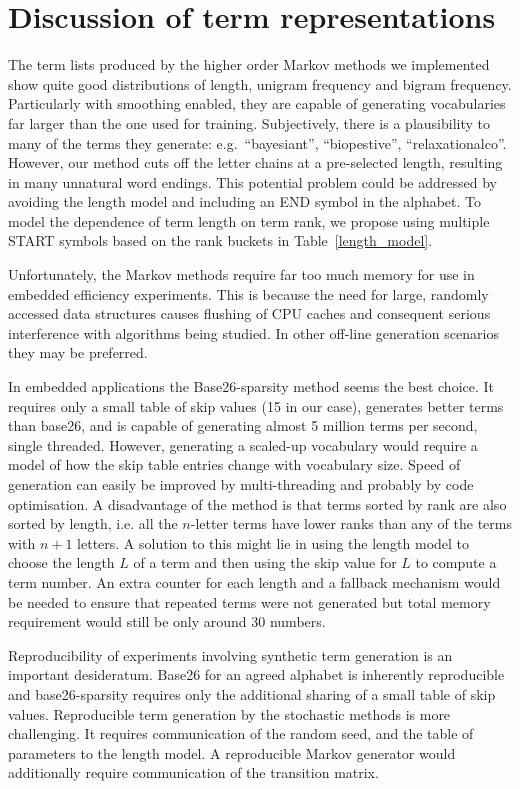 \documentclass[11pt]{report}
\begin{document}
\section{Discussion of term representations}

The term lists produced by the higher order Markov
methods we implemented show quite good distributions of length,
unigram frequency and bigram frequency.  Particularly with smoothing
enabled, they are capable of generating vocabularies far larger than
the one used for training. Subjectively, there is
a plausibility to many of the terms they generate: e.g.\ ``bayesiant'',
``biopestive'', ``relaxationalco''.  However, our
method cuts off the letter chains at a pre-selected length,
resulting in many unnatural word endings.  This potential problem could be
addressed by avoiding the length model and including an END symbol 
in the alphabet.  To model the dependence of term length on term rank,
we propose using multiple START symbols based on the rank buckets in
Table~\ref{length_model}.  

Unfortunately, the Markov methods require far too much memory for use
in embedded efficiency experiments.  This is because the need for
large, randomly accessed data structures causes flushing of CPU caches
and consequent serious interference with algorithms being studied.  In
other off-line generation scenarios they may be preferred.

In embedded applications the Base26-sparsity method seems the best
choice.  It requires only a small table of skip values (15 in our
case), generates better terms than base26, and is capable of
generating almost 5 million terms per second, single threaded.  However, generating a
scaled-up vocabulary would require a model of how the skip table entries
change with vocabulary size. Speed of generation can
easily be improved by multi-threading and probably by code
optimisation.  A disadvantage of the method is that terms sorted by
rank are also sorted by length, i.e. all the $n$-letter terms have
lower ranks than any of the terms with $n + 1$ letters.  A solution to
this might lie in using the length model to choose the length $L$ of a
term and then using the skip value for $L$ to compute a term
number.  An extra counter for each length and a fallback mechanism
would be needed to ensure that repeated terms were not generated but
total memory requirement would still be only around 30 numbers.

Reproducibility of experiments involving synthetic term generation is
an important desideratum.  Base26 for an
agreed alphabet is inherently reproducible and base26-sparsity
requires only the additional sharing of a small table of skip values.
Reproducible term generation by the stochastic methods is more
challenging.  It requires communication of the random seed, and the
table of parameters to the length model.  A reproducible
Markov generator would additionally require communication of the 
transition matrix.
\end{document}
